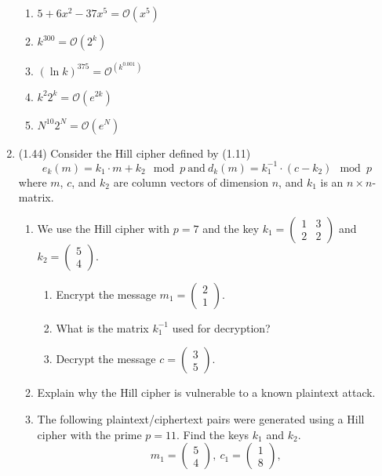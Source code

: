 \documentclass[12pt]{amsart}
\theoremstyle{definition}
\begin{document}
\begin{enumerate}
\begin{enumerate}
		\item $5+6x^2-37x^5 = \mathcal O(x^5)$
		\item $k^{300} = \mathcal O(2^k)$ 
		\item $(\ln k)^{375} = \mathcal O^(k^{0.001})$
		\item $k^2 2^k = \mathcal O(e^{2k})$
		\item $N^{10} 2^N = \mathcal O(e^N)$
	\end{enumerate}
\item (1.44) Consider the Hill cipher defined by (1.11) 
	\begin{displaymath}
		e_k(m) = k_1 \cdot m + k_2 \mod p \ \text{and} \ d_k(m) = k_1^{-1} \cdot (c - k_2) \mod p
	\end{displaymath}
	where $m$, $c$, and $k_2$ are column vectors of dimension $n$, and $k_1$ is an $n \times n$-matrix. 
	\begin{enumerate}
		\item We use the Hill cipher with $p=7$ and the key $k_1 = \begin{pmatrix} 1 & 3 \\ 2 & 2 
		\end{pmatrix}$ and $k_2 = \begin{pmatrix} 5 \\ 4 \end{pmatrix}$. 
		\begin{enumerate}
			\item Encrypt the message $m_1 = \begin{pmatrix} 2 \\ 1 \end{pmatrix}$. 
			\item What is the matrix $k_1^{-1}$ used for decryption?
			\item Decrypt the message $c = \begin{pmatrix} 3 \\ 5 \end{pmatrix}$.
		\end{enumerate}
		\item Explain why the Hill cipher is vulnerable to a known plaintext attack. 
		\item The following plaintext/ciphertext pairs were generated using a Hill cipher with 
			the prime $p=11$. Find the keys $k_1$ and $k_2$. 
		\begin{displaymath}
			m_1 = \begin{pmatrix} 5 \\ 4 \end{pmatrix}, \ c_1 = \begin{pmatrix} 1 \\ 8 \end{pmatrix}, 

\end{displaymath}
\end{enumerate}
\end{enumerate}
\end{document}
